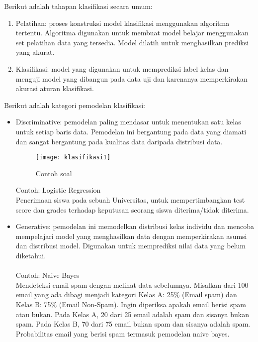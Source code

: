 \noindent Berikut adalah tahapan klasifikasi secara umum:
\begin{enumerate}

\item
Pelatihan: proses konstruksi model klasifikasi menggunakan algoritma tertentu. Algoritma digunakan untuk membuat model belajar menggunakan set pelatihan data yang tersedia. Model dilatih untuk menghasilkan prediksi yang akurat.

\item
Klasifikasi: model yang digunakan untuk memprediksi label kelas dan menguji model yang dibangun pada data uji dan karenanya memperkirakan akurasi aturan klasifikasi.
\end{enumerate}
\vspace{0.3cm}
\noindent Berikut adalah kategori pemodelan klasifikasi:
\begin{itemize}

\item 
Discriminative: pemodelan paling mendasar untuk menentukan satu kelas untuk setiap baris data. Pemodelan ini bergantung pada data yang diamati dan sangat bergantung pada kualitas data daripada distribusi data.

\begin{figure}[H]
	\centering
	\texttt{[image: klasifikasi1]}
	\caption{Contoh soal}
	\label{fig:klasifikasi1}
\end{figure}

Contoh: Logistic Regression\\
Penerimaan siswa pada sebuah Universitas, untuk mempertimbangkan test score dan grades terhadap keputusan seorang siswa diterima/tidak diterima.

\item 
Generative: pemodelan ini memodelkan distribusi kelas individu dan mencoba mempelajari model yang menghasilkan data dengan memperkirakan asumsi dan distribusi model. Digunakan untuk memprediksi nilai data yang belum diketahui. \\\\
Contoh: Naive Bayes \\
Mendeteksi email spam dengan melihat data sebelumnya. Misalkan dari 100 email yang ada dibagi menjadi kategori Kelas A: 25\% (Email spam) dan Kelas B: 75\% (Email Non-Spam). Ingin diperiksa apakah email berisi  spam atau bukan. Pada Kelas A, 20 dari 25 email adalah spam dan sisanya bukan spam. Pada Kelas B, 70 dari 75 email bukan spam dan sisanya adalah spam. Probabilitas email yang berisi spam termasuk pemodelan naive bayes. \\
\end{itemize}

